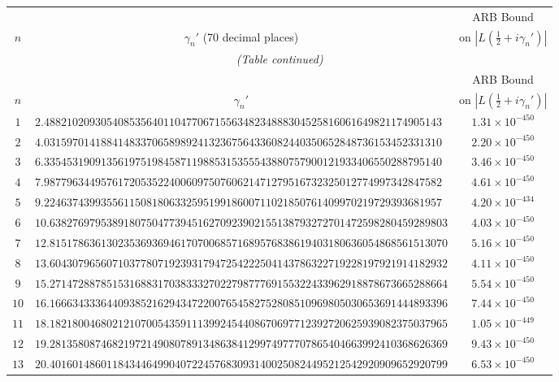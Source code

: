 \documentclass[12pt,reqno]{amsart}
\theoremstyle{remark}
\begin{document}
\renewcommand{\arraystretch}{1.1}
\setlength{\LTleft}{\fill}
\setlength{\LTright}{\fill}
\footnotesize
\begin{longtable}{clc}
\toprule
 & & ARB Bound \\
$n$ & \multicolumn{1}{c}{$\gamma_n'$ (70 decimal places)} & on $|L(\tfrac{1}{2}+i\gamma_n')|$ \\
\midrule
\endfirsthead
\multicolumn{3}{c}{\small\itshape (Table continued)} \\
\toprule
 & & ARB Bound \\
$n$ & \multicolumn{1}{c}{$\gamma_n'$} & on $|L(\tfrac{1}{2}+i\gamma_n')|$ \\
\midrule
\endhead
\bottomrule
\endlastfoot
$1$ & $2.4882102093054085356401104770671556348234888304525816061649821174905143$ & $1.31\times 10^{-450}$ \\
$2$ & $4.0315970141884148337065898924132367564336082440350652848736153452331310$ & $2.20\times 10^{-450}$ \\
$3$ & $6.3354531909135619751984587119885315355543880757900121933406550288795140$ & $3.46\times 10^{-450}$ \\
$4$ & $7.9877963449576172053522400609750760621471279516732325012774997342847582$ & $4.61\times 10^{-450}$ \\
$5$ & $9.2246374399355611508180633259519918600711021850761409970219729393681957$ & $4.20\times 10^{-434}$ \\
$6$ & $10.6382769795389180750477394516270923902155138793272701472598280459289803$ & $4.03\times 10^{-450}$ \\
$7$ & $12.8151786361302353693694617070068571689576838619403180636054868561513070$ & $5.16\times 10^{-450}$ \\
$8$ & $13.6043079656071037780719239317947254222504143786322719228197921914182932$ & $4.11\times 10^{-450}$ \\
$9$ & $15.2714728878515316883170383332702279877769155322433962918878673665288664$ & $5.54\times 10^{-450}$ \\
$10$ & $16.1666343336440938521629434722007654582752808510969805030653691444893396$ & $7.44\times 10^{-450}$ \\
$11$ & $18.1821800468021210700543591113992454408670697712392720625939082375037965$ & $1.05\times 10^{-449}$ \\
$12$ & $19.2813580874682197214908078913486384129974977707865404663992410368626369$ & $9.43\times 10^{-450}$ \\
$13$ & $20.4016014860118434464990407224576830931400250824495212542920909652920799$ & $6.53\times 10^{-450}$ \\

\end{longtable}
\end{document}
